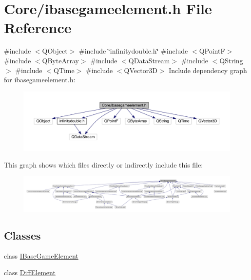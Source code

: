 \hypertarget{a00047}{}\section{Core/ibasegameelement.h File Reference}
\label{a00047}
{\ttfamily \#include $<$Q\+Object$>$}\newline
{\ttfamily \#include \char`\"{}infinitydouble.\+h\char`\"{}}\newline
{\ttfamily \#include $<$Q\+PointF$>$}\newline
{\ttfamily \#include $<$Q\+Byte\+Array$>$}\newline
{\ttfamily \#include $<$Q\+Data\+Stream$>$}\newline
{\ttfamily \#include $<$Q\+String$>$}\newline
{\ttfamily \#include $<$Q\+Time$>$}\newline
{\ttfamily \#include $<$Q\+Vector3D$>$}\newline
Include dependency graph for ibasegameelement.\+h\+:
\nopagebreak
\begin{figure}[H]
\begin{center}
\leavevmode
\includegraphics[width=350pt]{d4/dca/a00048}
\end{center}
\end{figure}
This graph shows which files directly or indirectly include this file\+:
\nopagebreak
\begin{figure}[H]
\begin{center}
\leavevmode
\includegraphics[width=350pt]{d2/dee/a00049}
\end{center}
\end{figure}
\subsection*{Classes}
\begin{DoxyCompactItemize}
\item 
class \hyperlink{a00137}{I\+Base\+Game\+Element}
\item 
class \hyperlink{a00141}{Diff\+Element}
\end{DoxyCompactItemize}
